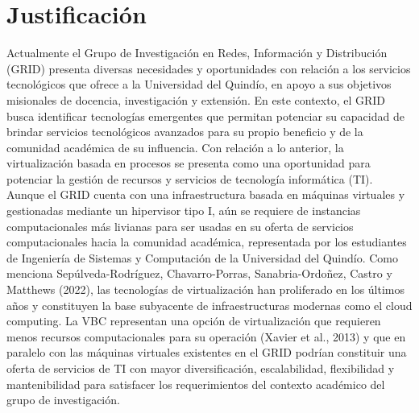 \chapter*{Justificación}
Actualmente el Grupo de Investigación en Redes, Información y Distribución (GRID) presenta diversas necesidades y oportunidades con relación a los servicios tecnológicos que ofrece a la Universidad del Quindío, en apoyo a sus objetivos misionales de docencia, investigación y extensión. En este contexto, el GRID busca identificar tecnologías emergentes que permitan potenciar su capacidad de brindar servicios tecnológicos avanzados para su propio beneficio y de la comunidad académica de su influencia. Con relación a lo anterior, la virtualización basada en procesos se presenta como una oportunidad para potenciar la gestión de recursos y servicios de tecnología informática (TI). Aunque el GRID cuenta con una infraestructura basada en máquinas virtuales y gestionadas mediante un hipervisor tipo I, aún se requiere de instancias computacionales más livianas para ser usadas en su oferta de servicios computacionales hacia la comunidad académica, representada por los estudiantes de Ingeniería de Sistemas y Computación de la Universidad del Quindío.
Como menciona Sepúlveda-Rodríguez, Chavarro-Porras, Sanabria-Ordoñez, Castro y Matthews (2022), las tecnologías de virtualización han proliferado en los últimos años y constituyen la base subyacente de infraestructuras modernas como el cloud computing. La VBC representan una opción de virtualización que requieren menos recursos computacionales para su operación (Xavier et al., 2013) y que en paralelo con las máquinas virtuales existentes en el GRID podrían constituir una oferta de servicios de TI con mayor diversificación, escalabilidad, flexibilidad y mantenibilidad para satisfacer los requerimientos del contexto académico del grupo de investigación. 